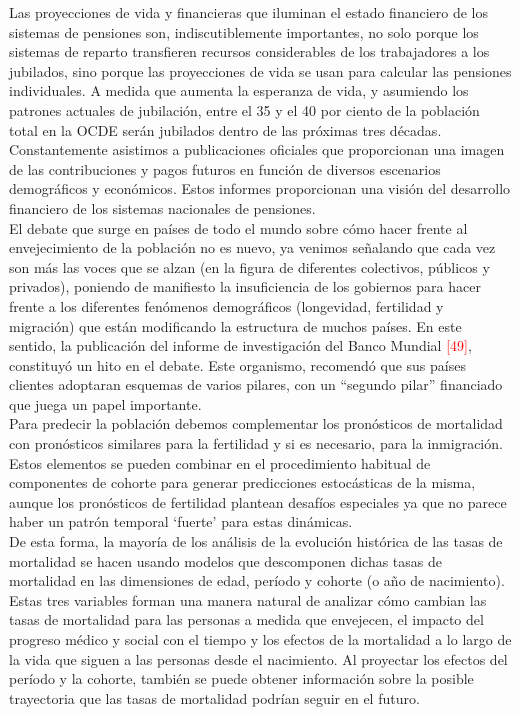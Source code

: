 Las proyecciones de vida y financieras que iluminan el estado financiero de los sistemas de pensiones son, indiscutiblemente importantes, no solo porque los sistemas de reparto transfieren recursos considerables de los trabajadores a los jubilados, sino porque las proyecciones de vida se usan para calcular las pensiones individuales. A medida que aumenta la esperanza de vida, y asumiendo los patrones actuales de jubilaci\'on, entre el 35 y el 40 por ciento de la población total en la OCDE ser\'an jubilados dentro de las pr\'oximas tres d\'ecadas.\\

Constantemente asistimos a publicaciones oficiales que proporcionan una imagen de las contribuciones y pagos futuros en función de diversos escenarios demográficos y económicos. Estos informes proporcionan una visión del desarrollo financiero de los sistemas nacionales de pensiones.\\

El debate que surge en pa\'ises de todo el mundo sobre c\'omo hacer frente al envejecimiento de la poblaci\'on no es nuevo, ya venimos se\~nalando que cada vez son m\'as las voces que se alzan (en la figura de diferentes colectivos, p\'ublicos y privados), poniendo de manifiesto la insuficiencia de los gobiernos para hacer frente a los diferentes fen\'omenos demogr\'aficos (longevidad, fertilidad y migración) que est\'an modificando la estructura de muchos pa\'ises. En este sentido, la publicaci\'on del informe de investigaci\'on del Banco Mundial \textcolor{red}{[49]}, constituy\'o un hito en el debate. Este organismo, recomend\'o que sus pa\'ises clientes adoptaran esquemas de varios pilares, con un ``segundo pilar'' financiado que juega un papel importante.\\

Para predecir la poblaci\'on debemos complementar los pron\'osticos de mortalidad con pron\'osticos similares para la fertilidad y si es necesario, para la inmigraci\'on. Estos elementos se pueden combinar en el procedimiento habitual de componentes de cohorte para generar predicciones estoc\'asticas de la misma, aunque los pron\'osticos de fertilidad plantean desaf\'ios especiales ya que no parece haber un patr\'on temporal `fuerte' para estas din\'amicas.\\

De esta forma, la mayoría de los análisis de la evolución histórica de las tasas de mortalidad se hacen usando modelos que descomponen dichas tasas de mortalidad en las dimensiones de edad, período y cohorte (o año de nacimiento). Estas tres variables forman una manera natural de analizar cómo cambian las tasas de mortalidad para las personas a medida que envejecen, el impacto del progreso médico y social con el tiempo y los efectos de la mortalidad a lo largo de la vida que siguen a las personas desde el nacimiento. Al proyectar los efectos del período y la cohorte, también se puede obtener información sobre la posible trayectoria que las tasas de mortalidad podrían seguir en el futuro.\\

